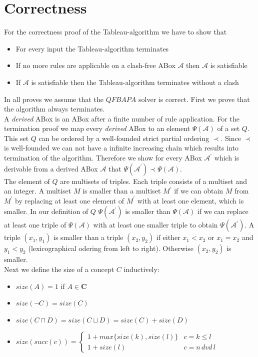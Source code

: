 \documentclass{book}
\theoremstyle{break}
\theoremstyle{definition}
\begin{document}
\chapter{Correctness}
For the correctness proof of the Tableau-algorithm we have to show that
\begin{itemize}
\item For every input the Tableau-algorithm terminates
\item If no more rules are applicable on a clash-free ABox $\mathcal{A}$ then $\mathcal{A}$ is satisfiable
\item If $\mathcal{A}$ is satisfiable then the Tableau-algorithm terminates without a clash
\end{itemize}
In all proves we assume that the $QFBAPA$ solver is correct. First we prove that the algorithm always terminates.\\
A \textit{derived} ABox is an ABox after a finite number of rule application. For the termination proof we map every \textit{derived} ABox to an element $\Psi(\mathcal{A})$ of a set $Q$. This set $Q$ can be ordered by a well-founded strict partial ordering $\prec$. Since $\prec$ is well-founded we can not have a infinite increasing chain which results into termination of the algorithm. Therefore we show for every ABox $\mathcal{A}^\prime$ which is derivable from a derived ABox $\mathcal{A}$ that $\Psi(\mathcal{A}^\prime)\prec\Psi(\mathcal{A})$.\\
The element of $Q$ are multisets of triples. Each triple consists of a multiset and an integer. A multiset $M$ is smaller than a multiset $M^\prime$ if we can obtain $M$ from $M^\prime$ by replacing at least one element of $M^\prime$ with at least one element, which is smaller. In our definition of $Q$ $\Psi(\mathcal{A}^\prime)$ is smaller than $\Psi(\mathcal{A})$ if we can replace at least one triple of $\Psi(\mathcal{A})$ with at least one smaller triple to obtain $\Psi(\mathcal{A}^\prime)$. A triple $(x_1,y_1)$ is smaller than a triple $(x_2,y_2)$ if either $x_1<x_2$ or $x_1=x_2$ and $y_1<y_2$ (lexicographical odering from left to right). Otherwise $(x_2,y_2)$ is smaller.\\
Next we define the size of a concept $C$ inductively:
\begin{itemize}
\item $size(A)=1$ if $A\in\mathbf{C}$
\item $size(\neg C)=size(C)$
\item $size(C\sqcap D)=size(C\sqcup D)= size(C)+ size(D)$
\item $size(succ(c))=\begin{cases}
1+max\{size(k),size(l)\} & c=k\leq l \\
1+size(l)& c= n\,dvd\,l
\end{cases}$
\end{itemize}
\end{document}
